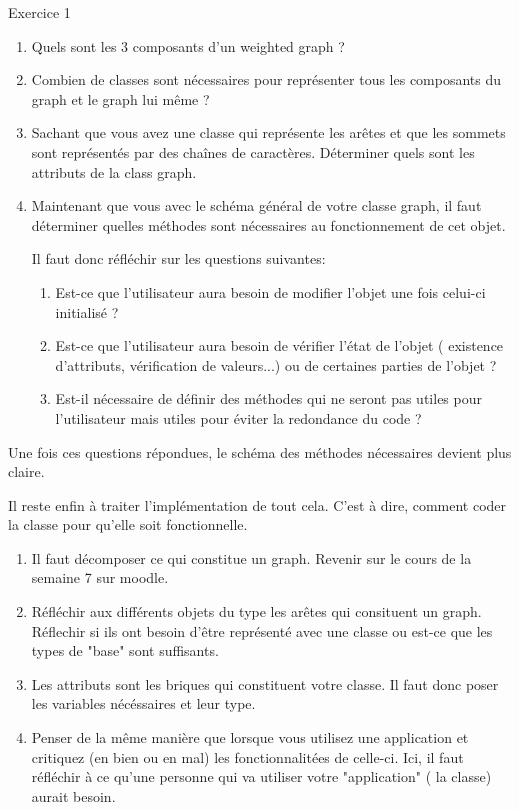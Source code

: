 \begin{Exercice} Exercice 1\\
    \begin{enumerate}
        \item Quels sont les 3 composants d'un weighted graph ?
        \item Combien de classes sont nécessaires pour représenter tous les composants du graph et le graph lui même ?
        \item Sachant que vous avez une classe qui représente les arêtes et que les sommets sont représentés par des chaînes de caractères. Déterminer quels sont les attributs de la class graph.
        \item Maintenant que vous avec le schéma général de votre classe graph, il faut déterminer quelles méthodes sont nécessaires au fonctionnement de cet objet.
        
        Il faut donc réfléchir sur les questions suivantes:
            \begin{enumerate}
            \item Est-ce que l'utilisateur aura besoin de modifier l'objet une fois celui-ci initialisé ?
            \item Est-ce que l'utilisateur aura besoin de vérifier l'état de l'objet ( existence d'attributs, vérification de valeurs...) ou de certaines parties de l'objet ?
            \item Est-il nécessaire de définir des méthodes qui ne seront pas utiles pour l'utilisateur mais utiles pour éviter la redondance du code ?
            \end{enumerate}
    \end{enumerate}
    Une fois ces questions répondues, le schéma des méthodes nécessaires devient plus claire.
    
    Il reste enfin à traiter l'implémentation de tout cela. C'est à dire, comment coder la classe pour qu'elle soit fonctionnelle.
\begin{conseil}
   \begin{enumerate}
   \item Il faut décomposer ce qui constitue un graph. Revenir sur le cours de la semaine 7 sur moodle.
   \item Réfléchir aux différents objets du type les arêtes qui consituent un graph. Réflechir si ils ont besoin d'être représenté avec une classe ou est-ce que les types de "base" sont suffisants.
   \item Les attributs sont les briques qui constituent votre classe. Il faut donc poser les variables nécéssaires et leur type.
   \item Penser de la même manière que lorsque vous utilisez une application et critiquez (en bien ou en mal) les fonctionnalitées de celle-ci. Ici, il faut réfléchir à ce qu'une personne qui va utiliser votre "application" ( la classe) aurait besoin.
   \end{enumerate}
\end{conseil}
    

\end{Exercice}
